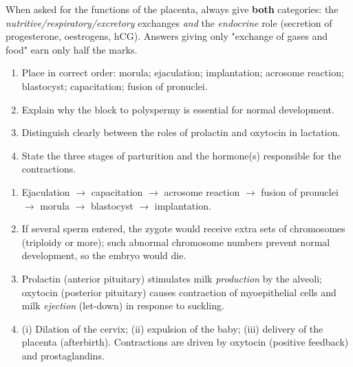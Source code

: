 \documentclass[11pt]{article}
\begin{document}
\begin{attention}
When asked for the functions of the placenta, always give \textbf{both} categories: the \emph{nutritive/respiratory/excretory} exchanges \emph{and} the \emph{endocrine} role (secretion of progesterone, oestrogens, hCG). Answers giving only "exchange of gases and food" earn only half the marks.
\end{attention}

\begin{exercice}
\begin{enumerate}
\item Place in correct order: morula; ejaculation; implantation; acrosome reaction; blastocyst; capacitation; fusion of pronuclei.
\item Explain why the block to polyspermy is essential for normal development.
\item Distinguish clearly between the roles of prolactin and oxytocin in lactation.
\item State the three stages of parturition and the hormone(s) responsible for the contractions.
\end{enumerate}
\end{exercice}

\begin{corrige}[Exercise n°1]
\begin{enumerate}
\item Ejaculation $\rightarrow$ capacitation $\rightarrow$ acrosome reaction $\rightarrow$ fusion of pronuclei $\rightarrow$ morula $\rightarrow$ blastocyst $\rightarrow$ implantation.
\item If several sperm entered, the zygote would receive extra sets of chromosomes (triploidy or more); such abnormal chromosome numbers prevent normal development, so the embryo would die.
\item Prolactin (anterior pituitary) stimulates milk \emph{production} by the alveoli; oxytocin (posterior pituitary) causes contraction of myoepithelial cells and milk \emph{ejection} (let-down) in response to suckling.
\item (i) Dilation of the cervix; (ii) expulsion of the baby; (iii) delivery of the placenta (afterbirth). Contractions are driven by oxytocin (positive feedback) and prostaglandins.
\end{enumerate}
\end{corrige}
\end{document}
